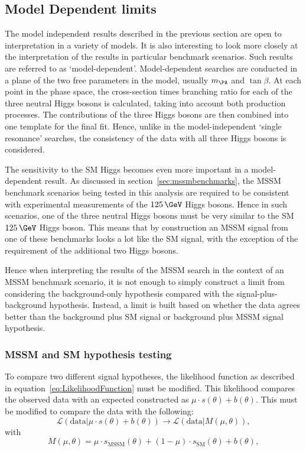\subsection{Model Dependent limits}
\label{sec:modeldependent}

The model independent results described in the previous section are open to
interpretation in a variety of models. It is also interesting to look more
closely at the interpretation of the results in particular benchmark scenarios.
Such results are referred to as `model-dependent'. Model-dependent searches are
conducted in a plane of the two free parameters in the model, usually $m_{\PA}$
and $\tan\beta$. At each point in the phase space, the cross-section times
branching ratio for each of the three neutral Higgs bosons is calculated, taking
into account both production processes. The contributions of the three Higgs
bosons are then combined into one template for the final fit. Hence, unlike in the
model-independent `single resonance' searches, the consistency of the data with
all three Higgs bosons is considered. 

The sensitivity to the \ac{SM} Higgs becomes even more important in a
model-dependent result. As discussed in
section~\ref{sec:mssmbenchmarks}, the \ac{MSSM} benchmark scenarios being tested in this
analysis are required to be consistent with experimental measurements of the
$125\,\GeV$ Higgs bosons. Hence in such scenarios, one of the three neutral Higgs
bosons must be very similar to the \ac{SM} $125\,\GeV$ Higgs boson. This means
that by construction an \ac{MSSM} signal from one of these benchmarks looks a
lot like the \ac{SM} signal, with the exception of the requirement of the
additional two Higgs bosons.

Hence when interpreting the results of the \ac{MSSM} search in the context of an
\ac{MSSM} benchmark scenario, it is not enough to simply construct a limit from
considering the background-only hypothesis compared with the
signal-plus-background hypothesis. Instead, a limit is built based on
whether the data agrees better than the background plus \ac{SM} signal or
background plus \ac{MSSM} signal hypothesis.

\subsubsection{MSSM and SM hypothesis testing}

To compare two different signal hypotheses, the likelihood function as described
in equation~\ref{eq:LikelihoodFunction} must be modified. This likelihood compares 
the observed data with an expected constructed as
$\mu \cdot s(\theta) + b(\theta)$. This must be modified to compare the data with the
following:
\begin{equation}
\mathcal{L}(\text{data} | \mu \cdot s(\theta) + b(\theta)) \rightarrow
\mathcal{L}(\text{data} | M(\mu,\theta)),
\end{equation}
with
\begin{equation}
M(\mu,\theta) = \mu \cdot s_{\text{MSSM}}(\theta) + (1-\mu) \cdot
s_{\text{SM}}(\theta) + b(\theta), 
\end{equation}


